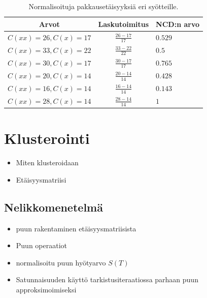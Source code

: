 \documentclass[12pt,finnish]{tktltiki2}
\theoremstyle{definition}
\theoremstyle{remark}
\begin{document}
  \begin{table}[t]
    \begin{tabular}{c|c|l}
      Arvot                    & Laskutoimitus      & NCD:n arvo \\ \hline
      $ C(xx) = 26, C(x) = 17$ & $\frac{26-17}{17} $ & $0.529$    \\ \hline
      $ C(xx) = 33, C(x) = 22$ & $\frac{33-22}{22} $ & $0.5$      \\ \hline
      $ C(xx) = 30, C(x) = 17$ & $\frac{30-17}{17} $ & $0.765$    \\ \hline
      $ C(xx) = 20, C(x) = 14$ & $\frac{20-14}{14} $ & $0.428$    \\ \hline
      $ C(xx) = 16, C(x) = 14$ & $\frac{16-14}{14} $ & $0.143$    \\ \hline
      $ C(xx) = 28, C(x) = 14$ & $\frac{28-14}{14} $ & $1$        \\
    \end{tabular}
    \caption{Normalisoituja pakkausetäisyyksiä eri syötteille.}
    \label{tab:NCD-values}
  \end{table}


\section{Klusterointi} %
  \label{sec:klusterointi}
    \begin{itemize}
      \item Miten klusteroidaan
      \item Etäisyysmatriisi
    \end{itemize}
    \subsection{Nelikkomenetelmä} %
    \label{sub:nelikkomenetelma}



    \begin{itemize}
      \item puun rakentaminen etäisyysmatriisista
      \item Puun operaatiot
      \item normalisoitu puun hyötyarvo $S(T)$
      \item Satunnaisuuden käyttö tarkistusiteraatiossa parhaan puun approksimoimiseksi
    \end{itemize}
\end{document}
